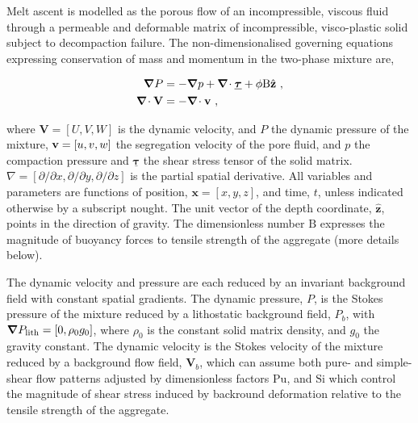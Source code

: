 \documentclass[12pt,a4paper]{article}
\begin{document}
Melt ascent is modelled as the porous flow of an incompressible, viscous fluid through a permeable and deformable matrix of incompressible, visco-plastic solid subject to decompaction failure. The non-dimensionalised governing equations expressing conservation of mass and momentum in the two-phase mixture are,
\begin{linenomath*}
\begin{subequations}
\label{eq:governing}
\begin{align}
	\label{eq:moment-mixture}
	\mbox{\boldmath $\nabla$} P &= - \mbox{\boldmath $\nabla$} p + \mbox{\boldmath $\nabla$}\!\cdot \underline{\boldsymbol{\tau}} + \phi \mathrm{B} \hat{\mathbf{z}}  \ , \\
	\label{eq:mass-mixture}
	\mbox{\boldmath $\nabla$}\!\cdot \mathbf{V} &= - \mbox{\boldmath $\nabla$}\!\cdot \mbox{{\bf v}} \ ,
\end{align}
\end{subequations}
\end{linenomath*}
where $\mathbf{V} = [U,V,W]$ is the dynamic velocity, and $P$ the dynamic pressure of the mixture, $\mbox{{\bf v}} = [u,v,w]$ the segregation velocity of the pore fluid, and $p$ the compaction pressure and $\underline{\boldsymbol{\tau}}$ the shear stress tensor of the solid matrix. $\nabla = [\partial/\partial x,\partial/\partial y,\partial/\partial z]$ is the partial spatial derivative. All variables and parameters are functions of position, $\mathbf{x} = [x,y,z]$, and time, $t$, unless indicated otherwise by a subscript nought. The unit vector of the depth coordinate,  $\hat{\mathbf{z}} $, points in the direction of gravity. The dimensionless number $\mathrm{B}$ expresses the magnitude of buoyancy forces to tensile strength of the aggregate (more details below). 


The dynamic velocity and pressure are each reduced by an invariant background field with constant spatial gradients. The dynamic pressure, $P$, is the Stokes pressure of the mixture reduced by a lithostatic background field, $P_b$, with $\mbox{\boldmath $\nabla$} P_\mathrm{lith} = [0,\rho_0 g_0]$, where $\rho_0$ is the constant solid matrix density, and $g_0$ the gravity constant. The dynamic velocity is the Stokes velocity of the mixture reduced by a background flow field, $\mathbf{V}_b$, which can assume both pure- and simple-shear flow patterns adjusted by dimensionless factors $\mathrm{Pu}$, and $\mathrm{Si}$ which control the magnitude of shear stress induced by backround deformation relative to the tensile strength of the aggregate.
\end{document}

